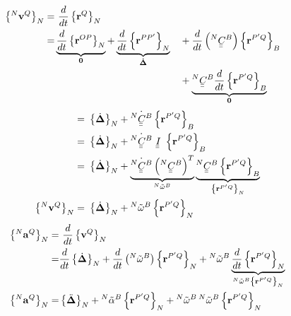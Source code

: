 \documentclass[a4paper]{article}
\newcommand{\ubar}[1]{\underaccent{\bar}{#1}}
\begin{document}
\begin{alignat}{2}
  \left\{ \prescript{N}{}{\mathbf{v}}^{Q} \right\}_{N} =& \ \frac{d}{dt}\left\{ \mathbf{r}^{Q} \right\}_{N} \\
  =& \underbrace{\frac{d}{dt}\left\{ \mathbf{r}^{OP} \right\}_{N}}_{\mathbf{0}}
   + \underbrace{\frac{d}{dt}\left\{ \mathbf{r}^{PP'} \right\}_{N}}_{\mathbf{\dot{\Delta}}}  
   &&+ \frac{d}{dt}\left( \prescript{N}{}{\ubar{\ubar{C}}}^{B} \right)\left\{ \mathbf{r}^{P'Q} \right\}_{B}  \nonumber\\
   & &&+ \underbrace{\prescript{N}{}{\ubar{\ubar{C}}}^{B} \frac{d}{dt}\left\{ \mathbf{r}^{P'Q} \right\}_{B}}_{\mathbf{0}} 
  \end{alignat}
\begin{align}
  =& \ \left\{ \dot{\mathbf{\Delta}} \right\}_{N} 
     + \dot{\prescript{N}{}{\ubar{\ubar{C}}}^{B}} \left\{ \mathbf{r}^{P'Q} \right\}_{B} \\
  =& \ \left\{ \dot{\mathbf{\Delta}} \right\}_{N} 
  + \dot{\prescript{N}{}{\ubar{\ubar{C}}}^{B}} \ \ubar{\ubar{I}} \ \left\{ \mathbf{r}^{P'Q} \right\}_{B}  \\
  =& \ \left\{ \dot{\mathbf{\Delta}} \right\}_{N} 
     +  \underbrace{\dot{\prescript{N}{}{\ubar{\ubar{C}}}^{B}} 
     \left( \prescript{N}{}{\ubar{\ubar{C}}}^{B} \right)^{T}}_{\prescript{N}{}{\tilde{\omega}}^{B}} 
	\underbrace{\prescript{N}{}{\ubar{\ubar{C}}}^{B} \left\{ \mathbf{r}^{P'Q} \right\}_{B}}_{ \left\{ \mathbf{r}^{P'Q} \right\}_{N}} \\
  \left\{ \prescript{N}{}{\mathbf{v}}^{Q} \right\}_{N} =& \ \left\{ \dot{\mathbf{\Delta}} \right\}_{N}  
  +  \prescript{N}{}{\tilde{\omega}}^{B} \left\{ \mathbf{r}^{P'Q} \right\}_{N}
  \end{align}
\begin{alignat}{2}
  \left\{ \prescript{N}{}{\mathbf{a}}^{Q} \right\}_{N} =& \ \frac{d}{dt}\left\{ \mathbf{v}^{Q} \right\}_{N} \\
  =& \frac{d}{dt} \left\{ \dot{\mathbf{\Delta}} \right\}_{N} 
    + \frac{d}{dt} \left( \prescript{N}{}{\tilde{\omega}}^{B} \right) \left\{ \mathbf{r}^{P'Q} \right\}_{N}
    + \prescript{N}{}{\tilde{\omega}}^{B} 
    \underbrace{\frac{d}{dt} \left\{ \mathbf{r}^{P'Q} \right\}_{N}}_{\prescript{N}{}{\tilde{\omega}}^{B} \left\{ \mathbf{r}^{P'Q} \right\}_{N} } \\
  \left\{ \prescript{N}{}{\mathbf{a}}^{Q} \right\}_{N} =& \left\{ \ddot{\mathbf{\Delta}} \right\}_{N} 
    + \prescript{N}{}{\tilde{\alpha}}^{B}  \left\{ \mathbf{r}^{P'Q} \right\}_{N}
    + \prescript{N}{}{\tilde{\omega}}^{B} \prescript{N}{}{\tilde{\omega}}^{B} \left\{ \mathbf{r}^{P'Q} \right\}_{N}
  \end{alignat}
\end{document}
